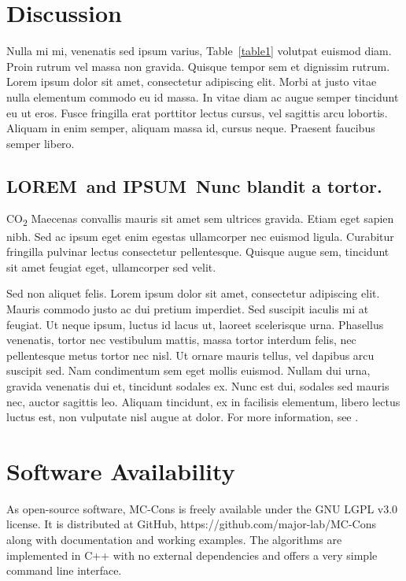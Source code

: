\documentclass[10pt,letterpaper]{article}
\newcommand{\lorem}{{\bf LOREM}}
\newcommand{\ipsum}{{\bf IPSUM}}
\begin{document}
\section*{Discussion}
Nulla mi mi, venenatis sed ipsum varius, Table~\ref{table1} volutpat euismod diam. Proin rutrum vel massa non gravida. Quisque tempor sem et dignissim rutrum. Lorem ipsum dolor sit amet, consectetur adipiscing elit. Morbi at justo vitae nulla elementum commodo eu id massa. In vitae diam ac augue semper tincidunt eu ut eros. Fusce fringilla erat porttitor lectus cursus, vel sagittis arcu lobortis. Aliquam in enim semper, aliquam massa id, cursus neque. Praesent faucibus semper libero.

\subsection*{\lorem\ and \ipsum\ Nunc blandit a tortor.}

CO\textsubscript{2} Maecenas convallis mauris sit amet sem ultrices gravida. Etiam eget sapien nibh. Sed ac ipsum eget enim egestas ullamcorper nec euismod ligula. Curabitur fringilla pulvinar lectus consectetur pellentesque. Quisque augue sem, tincidunt sit amet feugiat eget, ullamcorper sed velit. 

Sed non aliquet felis. Lorem ipsum dolor sit amet, consectetur adipiscing elit. Mauris commodo justo ac dui pretium imperdiet. Sed suscipit iaculis mi at feugiat. Ut neque ipsum, luctus id lacus ut, laoreet scelerisque urna. Phasellus venenatis, tortor nec vestibulum mattis, massa tortor interdum felis, nec pellentesque metus tortor nec nisl. Ut ornare mauris tellus, vel dapibus arcu suscipit sed. Nam condimentum sem eget mollis euismod. Nullam dui urna, gravida venenatis dui et, tincidunt sodales ex. Nunc est dui, sodales sed mauris nec, auctor sagittis leo. Aliquam tincidunt, ex in facilisis elementum, libero lectus luctus est, non vulputate nisl augue at dolor. For more information, see .

\section*{Software Availability} %
As open-source software, MC-Cons is freely available under the GNU LGPL v3.0 license. It is distributed at GitHub, https://github.com/major-lab/MC-Cons along with documentation and working examples. The algorithms are implemented in C++ with no external dependencies and offers a very simple command line interface.
\end{document}
